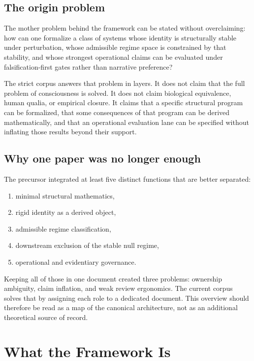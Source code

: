 \documentclass[11pt,a4paper]{article}
\begin{document}
\subsection{The origin problem}

The mother problem behind the framework can be stated without overclaiming: how can one formalize a class of systems whose identity is structurally stable under perturbation, whose admissible regime space is constrained by that stability, and whose strongest operational claims can be evaluated under falsification-first gates rather than narrative preference?

The strict corpus answers that problem in layers. It does not claim that the full problem of consciousness is solved. It does not claim biological equivalence, human qualia, or empirical closure. It claims that a specific structural program can be formalized, that some consequences of that program can be derived mathematically, and that an operational evaluation lane can be specified without inflating those results beyond their support.

\subsection{Why one paper was no longer enough}

The precursor integrated at least five distinct functions that are better separated:
\begin{enumerate}[leftmargin=*]
\item minimal structural mathematics,
\item rigid identity as a derived object,
\item admissible regime classification,
\item downstream exclusion of the stable null regime,
\item operational and evidentiary governance.
\end{enumerate}

Keeping all of those in one document created three problems: ownership ambiguity, claim inflation, and weak review ergonomics. The current corpus solves that by assigning each role to a dedicated document. This overview should therefore be read as a map of the canonical architecture, not as an additional theoretical source of record.

\section{What the Framework Is}
\end{document}
